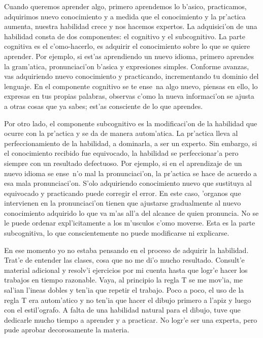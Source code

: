 \documentclass[11pt]{article}
\begin{document}
\medskip

Cuando queremos aprender algo, primero aprendemos lo b'asico, practicamos, adquirimos nuevo conocimiento y a medida que el conocimiento y la pr'actica aumenta, nuestra habilidad crece y nos hacemos expertos. La adquisici'on de una habilidad consta de dos componentes: el cognitivo y el subcognitivo. La parte cognitiva es el c'omo-hacerlo, es adquirir el conocimiento sobre lo que se quiere aprender. Por ejemplo, si est'as aprendiendo un nuevo idioma, primero aprendes la gram'atica, pronunciaci'on b'asica y expresiones simples. Conforme avanzas, vas adquiriendo nuevo conocimiento y practicando, incrementando tu dominio del lenguaje. En el componente cognitivo se te ense~na algo nuevo, piensas en ello, lo expresas en tus propias palabras, observas c'omo la nueva informaci'on se ajusta a otras cosas que ya sabes; est'as consciente de lo que aprendes.

\medskip
Por otro lado, el componente subcognitivo es la modificaci'on de la habilidad que ocurre con la pr'actica y se da de manera autom'atica. La pr'actica lleva al perfeccionamiento de la habilidad, a dominarla, a ser un experto. Sin embargo, si el conocimiento recibido fue equivocado, la habilidad se perfeccionar'a pero siempre con un resultado defectuoso. Por ejemplo, si en el aprendizaje de un nuevo idioma se ense~n'o mal la pronunciaci'on, la pr'actica se hace de acuerdo a esa mala pronunciaci'on. S'olo adquiriendo conocimiento nuevo que sustituya al equivocado y practicando puede corregir el error. En este caso, 'organos que intervienen en la pronunciaci'on tienen que ajustarse gradualmente al nuevo conocimiento adquirido lo que va m'as all'a del alcance de quien pronuncia. No se le puede ordenar expl'icitamente a los m'usculos c'omo moverse. Esta es la parte subcognitiva, lo que conscientemente no puede modificarse ni explicarse.

\medskip
En ese momento yo no estaba pensando en el proceso de adquirir la habilidad. Trat'e de entender las clases, cosa que no me di'o mucho resultado. Consult'e material adicional y resolv'i ejercicios por mi cuenta hasta que logr'e hacer los trabajos en tiempo razonable. Vaya, al principio la regla T se me mov'ia, me sal'ian l'ineas dobles y ten'ia que repetir el trabajo. Poco a poco, el uso de la regla T era autom'atico y no ten'ia que hacer el dibujo primero a l'apiz y luego con el estil'ografo. A falta de una habilidad natural para el dibujo, tuve que dedicarle mucho tiempo a aprender y a practicar. No logr'e ser una experta, pero pude aprobar decorosamente la materia. 
\end{document}
